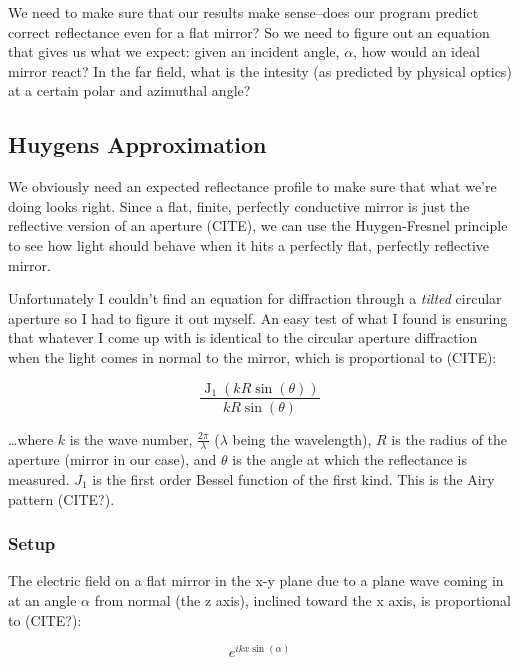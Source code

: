 \documentclass[etd,oneside,senior]{BYUPhys}
\DeclareMathOperator{\J}{J}
\begin{document}
We need to make sure that our results make sense--does our program predict correct reflectance even for a flat mirror? So we need to figure out an equation that gives us what we expect: given an incident angle, $\alpha$, how would an ideal mirror react? In the far field, what is the intesity (as predicted by physical optics) at a certain polar and azimuthal angle?

\subsection{Huygens Approximation} \label{subsec:huygens_approx}

We obviously need an expected reflectance profile to make sure that what we're doing looks right. Since a flat, finite, perfectly conductive mirror is just the reflective version of an aperture (CITE), we can use the Huygen-Fresnel principle to see how light should behave when it hits a perfectly flat, perfectly reflective mirror.

Unfortunately I couldn't find an equation for diffraction through a \textit{tilted} circular aperture so I had to figure it out myself. An easy test of what I found is ensuring that whatever I come up with is identical to the circular aperture diffraction when the light comes in normal to the mirror, which is proportional to (CITE):

\begin{equation}\label{eq:airy}
  \frac{\J_1(kR\sin(\theta))}{kR\sin(\theta)}
\end{equation}

\ldots where $k$ is the wave number, $\frac{2\pi}{\lambda}$ ($\lambda$ being the wavelength), $R$ is the radius of the aperture (mirror in our case), and $\theta$ is the angle at which the reflectance is measured. $J_1$ is the first order Bessel function of the first kind. This is the Airy pattern (CITE?).

\subsubsection{Setup}

The electric field on a flat mirror in the x-y plane due to a plane wave coming in at an angle $\alpha$ from normal (the z axis), inclined toward the x axis, is proportional to (CITE?):

\begin{equation}
  e^{ikx\sin\left({\alpha}\right)}
\end{equation}
\end{document}

